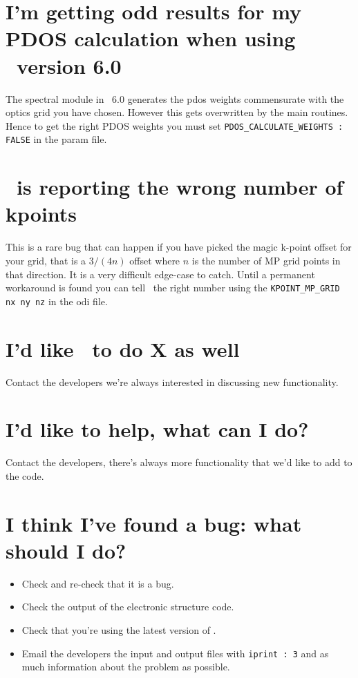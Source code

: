 \documentclass[a4paper,11pt,twoside]{book}
\begin{document}
{\section{I'm getting odd results for my PDOS calculation when using \castep\ version 6.0} \label{pdos_castep_6.0}
The spectral module in \castep\ 6.0 generates the pdos weights commensurate with the optics grid you have chosen. However this gets overwritten by the main routines. Hence to get the right PDOS weights you must set \verb#PDOS_CALCULATE_WEIGHTS : FALSE# in the param file.

\section{\optados\ is reporting the wrong number of kpoints}
This is a rare bug that can happen if you have picked the magic k-point offset for your grid, that is a $3/(4n)$ offset where $n$ is the number of MP grid points in that direction. It is a very difficult edge-case to catch. Until a permanent workaround is found you can tell \optados\ the right number using the \verb#KPOINT_MP_GRID nx ny nz# in the odi file. 

\section{I'd like \optados\ to do X as well}
Contact the developers we're always interested in discussing new functionality.

\section{I'd like to help, what can I do?}
Contact the developers, there's always more functionality that we'd
like to add to the code.  

\section{I think I've found a bug: what should I do?}
\begin{itemize}
\item Check and re-check that it is a bug.  
\item Check the output of the electronic structure code.
\item Check that you're using the latest version of \optados.
\item Email the developers the input and output files with
  \verb#iprint : 3# and as much information about the problem as possible.
\end{itemize}



}
\end{document}
